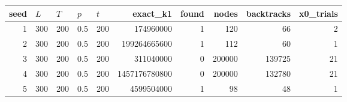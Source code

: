 \begin{tabular}{rllllrrrrr}%
\hline%
\textbf{seed}&$L$&$T$&$p$&$t$&\textbf{exact\_k1}&\textbf{found}&\textbf{nodes}&\textbf{backtracks}&\textbf{x0\_trials}\\%
\hline%
1&300&200&0.5&200&174960000&1&120&66&2\\%
2&300&200&0.5&200&199264665600&1&112&60&1\\%
3&300&200&0.5&200&311040000&0&200000&139725&21\\%
4&300&200&0.5&200&1457176780800&0&200000&132780&21\\%
5&300&200&0.5&200&4599504000&1&98&48&1\\%
\hline%
\end{tabular}
